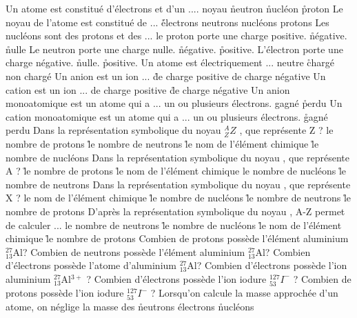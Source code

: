   \q
    Un atome est constitué d'électrons et d'un ....
    \rv 
    noyau
    \r
    neutron
    \r
    nucléon
    \r
    proton
  \q
    Le noyau de l'atome est constitué de ...
    \r 
    électrons
    \rv
    neutrons
    \rv
    nucléons
    \rv
    protons
      \q 
      Les nucléons sont des protons et des ...
    \q
         le proton porte une charge 
      \rv
       positive.
      \r
      négative.
      \r
      nulle
  \q 
  Le neutron porte une charge 
      \rv
      nulle.
      \r
      négative.
      \r
      positive.
  \q
  L'électron porte une charge
      \rv
      négative.
      \r
      nulle.
      \r
      positive.
  \q
  Un atome est électriquement ...
  \rv
  neutre
  \r
  chargé
  \rv
  non chargé
 \q
 Un anion est un ion ...
 \r
 de charge positive
 \rv
 de charge négative
  \q
  Un cation est un ion ...
 \rv
 de charge positive
 \r
 de charge négative
  \q
  Un anion monoatomique est un atome qui a ... un ou plusieurs électrons.
  \rv 
  gagné
  \r
  perdu
 \q
  Un cation monoatomique est un atome qui a ... un ou plusieurs électrons.
 \r 
  gagné
  \rv
  perdu
  \q
  Dans la représentation symbolique du noyau $_Z^AZ$ , que représente Z ?
   \rv
      le nombre de protons
      \r
      le nombre de neutrons
      \r
      le nom de l'élément chimique
      \r
      le nombre de nucléons
 \q
  Dans la représentation symbolique du noyau  , que représente A  ?
      \r
      le nombre de protons
      \r
      le nom de l'élément chimique
      \rv
      le nombre de nucléons
      \r
      le nombre de neutrons
 \q
  Dans la représentation symbolique du noyau  , que représente X  ?
      \rv
      le nom de l'élément chimique
      \r
      le nombre de nucléons
      \r
      le nombre de neutrons
      \r
      le nombre de protons
 \q
  D'après la représentation symbolique du noyau  , A-Z permet de calculer ...
      \rv
      le nombre de neutrons
      \r
      le nombre de nucléons
      \r
      le nom de l'élément chimique
      \r
      le nombre de protons
 \q
  Combien de protons possède l'élément aluminium $_{13}^{27}$Al? 
 \q
  Combien de neutrons possède l'élément aluminium $_{13}^{27}$Al? 
 \q
  Combien d'électrons possède l'atome d'aluminium $_{13}^{27}$Al?
 \q
  Combien d'électrons possède l'ion aluminium $_{13}^{27}$Al$^{3+}$ ? 
 \q
  Combien d'électrons possède l'ion iodure $_{53}^{127}I^- $ ?
 \q
  Combien de protons possède l'ion iodure $_{53}^{127}I^- $  ?
 \q
  Lorsqu'on calcule la masse approchée d'un atome, on néglige la masse des
      \r
      neutrons
      \rv
      électrons
      \r
      nucléons
